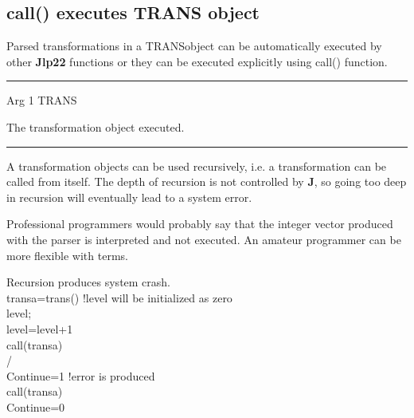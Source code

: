 \subsection{\textcolor{VioletRed}{call}() executes TRANS object}
\label{call}
Parsed transformations in a TRANSobject can be automatically executed by other \textbf{Jlp22}
functions or they can be executed explicitly using \textcolor{VioletRed}{call}() function.

\vspace{0.3cm}
\hrule
\vspace{0.3cm}
\noindent Arg \tabto{3cm} 1 \tabto{5cm}  TRANS \tabto{7cm}
\begin{changemargin}{3cm}{0cm}
\noindent  The transformation object executed.
\end {changemargin}
\hrule
\vspace{0.2cm}

\begin{note}
A transformation objects can be used recursively, i.e. a transformation can be called from
itself. The depth of recursion is not controlled by \textbf{J}, so going too deep in recursion will
eventually lead to a system error.
\end{note}
\begin{note}
Professional programmers would probably say that the integer vector produced with the parser
is interpreted and not executed. An amateur programmer can be more flexible with terms.
\end{note}
\begin{example}[recursion]Recursion produces system crash.\\
\label{recursion}
transa=\textcolor{VioletRed}{trans}() !level will be initialized as zero\\
level;\\
level=level+1\\
\textcolor{VioletRed}{call}(transa)\\
/\\
Continue=1  !error is produced\\
\textcolor{VioletRed}{call}(transa)\\
Continue=0
\end{example}
